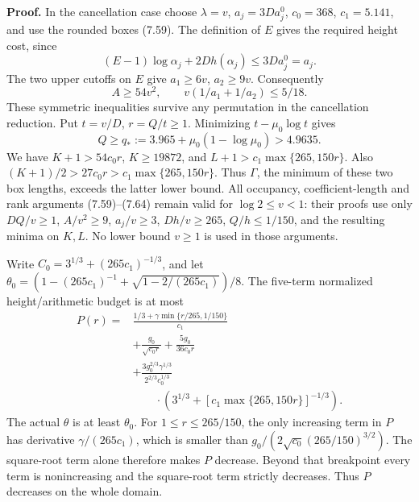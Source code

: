 \documentclass[
  11pt,
  a4paper,
]{article}
\begin{document}
\textbf{Proof.} In the cancellation case choose \(\lambda=v\),
\(a_j=3Da_j^0\), \(c_0=368\), \(c_1=5.141\), and use the rounded boxes
(7.59). The definition of \(E\) gives the required height cost, since \[
(E-1)\log\alpha_j+2Dh(\alpha_j)\le3Da_j^0=a_j.
\] The two upper cutoffs on \(E\) give \(a_1\ge6v\), \(a_2\ge9v\).
Consequently \[
A\ge54v^2,\qquad v(1/a_1+1/a_2)\le5/18.
\] These symmetric inequalities survive any permutation in the
cancellation reduction. Put \(t=v/D\), \(r=Q/t\ge1\). Minimizing
\(t-\mu_0\log t\) gives \[
Q\ge q_*:=3.965+\mu_0(1-\log\mu_0)>4.9635.
\] We have \(K+1>54c_0r\), \(K\ge19872\), and
\(L+1>c_1\max\{265,150r\}\). Also
\((K+1)/2>27c_0r>c_1\max\{265,150r\}\). Thus \(\Gamma\), the minimum of
these two box lengths, exceeds the latter lower bound. All occupancy,
coefficient-length and rank arguments (7.59)--(7.64) remain valid for
\(\log2\le v<1\): their proofs use only \(DQ/v\ge1\), \(A/v^2\ge9\),
\(a_j/v\ge3\), \(Dh/v\ge265\), \(Q/h\le1/150\), and the resulting minima
on \(K,L\). No lower bound \(v\ge1\) is used in those arguments.

Write \(C_0=3^{1/3}+(265c_1)^{-1/3}\), and let
\(\theta_0=(1-(265c_1)^{-1}+\sqrt{1-2/(265c_1)})/8\). The five-term
normalized height/arithmetic budget is at most \[
\begin{aligned}
P(r)={}&\frac{1/3+\gamma\min\{r/265,1/150\}}{c_1}\\
&+\frac{g_0}{\sqrt{c_0r}}+\frac{5g_0}{36c_0r}\\
&+\frac{3g_0^{2/3}\gamma^{1/3}}{2^{2/3}c_0^{1/3}}\\
&\qquad\cdot\left(3^{1/3}
+[c_1\max\{265,150r\}]^{-1/3}\right).
\end{aligned}
\] The actual \(\theta\) is at least \(\theta_0\). For
\(1\le r\le265/150\), the only increasing term in \(P\) has derivative
\(\gamma/(265c_1)\), which is smaller than
\(g_0/(2\sqrt{c_0}(265/150)^{3/2})\). The square-root term alone
therefore makes \(P\) decrease. Beyond that breakpoint every term is
nonincreasing and the square-root term strictly decreases. Thus \(P\)
decreases on the whole domain.
\end{document}
